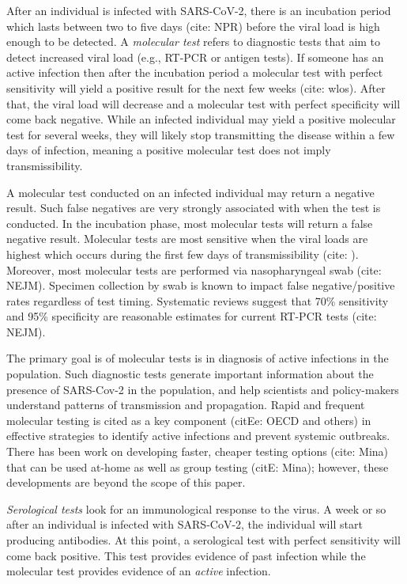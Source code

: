 \documentclass[11pt]{amsart}
\begin{document}
After an individual is infected with SARS-CoV-2, there is an incubation period which lasts between two to five days (cite: NPR) before the viral load is high enough to be detected.  A \emph{molecular test} refers to diagnostic tests that aim to detect increased viral load (e.g., RT-PCR or antigen tests).  If someone has an active infection then after the incubation period a molecular test with perfect sensitivity will yield a positive result for the next few weeks (cite: wlos).  After that, the viral load will decrease and a molecular test with perfect specificity will come back negative. While an infected individual may yield a positive molecular test for several weeks, they will likely stop transmitting the disease within a few days of infection, meaning a positive molecular test does not imply transmissibility.

A molecular test conducted on an infected individual may return a negative result.  Such false negatives are very strongly associated with when the test is conducted.  In the incubation phase, most molecular tests will return a false negative result.  Molecular tests are most sensitive when the viral loads are highest which occurs during the first few days of transmissibility (cite: ).   Moreover, most molecular tests are performed via nasopharyngeal swab (cite: NEJM).  Specimen collection by swab is known to impact false negative/positive rates regardless of test timing.   Systematic reviews suggest that 70\% sensitivity and 95\% specificity are reasonable estimates for current RT-PCR tests (cite: NEJM).

The primary goal is of molecular tests is in diagnosis of active infections in the population.  Such diagnostic tests generate important information about the presence of SARS-Cov-2 in the population, and help scientists and policy-makers understand patterns of transmission and propagation. Rapid and frequent molecular testing is cited as a key component (citEe: OECD and others) in effective strategies to identify active infections and prevent systemic outbreaks.  There has been work on developing faster, cheaper testing options (cite: Mina) that can be used at-home as well as group testing (citE: Mina); however, these developments are beyond the scope of this paper.

\emph{Serological tests} look for an immunological response to the virus.  A week or so after an individual is infected with SARS-CoV-2, the individual will start producing antibodies.  At this point, a serological test with perfect sensitivity will come back positive.  This test provides evidence of past infection while the molecular test provides evidence of an \emph{active} infection.
\end{document}
